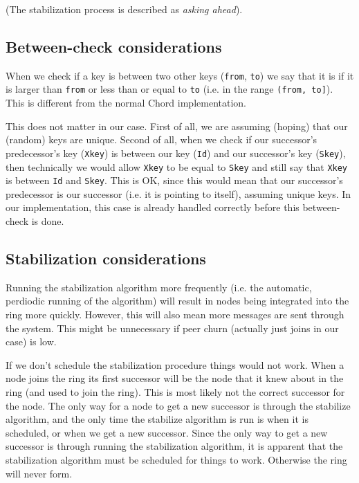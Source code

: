 \documentclass[a4paper, 11pt]{article}
\begin{document}
(The stabilization process is described as \textit{asking ahead}).

\subsection{Between-check considerations}

When we check if a key is between two other keys (\texttt{from}, \texttt{to}) we say that it is if it is larger than \texttt{from} or less than or equal to \texttt{to} (i.e. in the range \texttt{(from, to]}). This is different from the normal Chord implementation.

This does not matter in our case. First of all, we are assuming (hoping) that our (random) keys are unique. Second of all, when we check if our successor's predecessor's key (\texttt{Xkey}) is between our key (\texttt{Id}) and our successor's key (\texttt{Skey}), then technically we would allow \texttt{Xkey} to be equal to \texttt{Skey} and still say that \texttt{Xkey} is between \texttt{Id} and \texttt{Skey}. This is OK, since this would mean that our successor's predecessor is our successor (i.e. it is pointing to itself), assuming unique keys. In our implementation, this case is already handled correctly before this between-check is done.

\subsection{Stabilization considerations}

Running the stabilization algorithm more frequently (i.e. the automatic, perdiodic running of the algorithm) will result in nodes being integrated into the ring more quickly. However, this will also mean more messages are sent through the system. This might be unnecessary if peer churn (actually just joins in our case) is low. 

If we don't schedule the stabilization procedure things would not work. When a node joins the ring its first successor will be the node that it knew about in the ring (and used to join the ring). This is most likely not the correct successor for the node.
The only way for a node to get a new successor is through the stabilize algorithm, and the only time the stabilize algorithm is run is when it is scheduled, or when we get a new successor. Since the only way to get a new successor is through running the stabilization algorithm, it is apparent that the stabilization algorithm must be scheduled for things to work. Otherwise the ring will never form.
\end{document}
